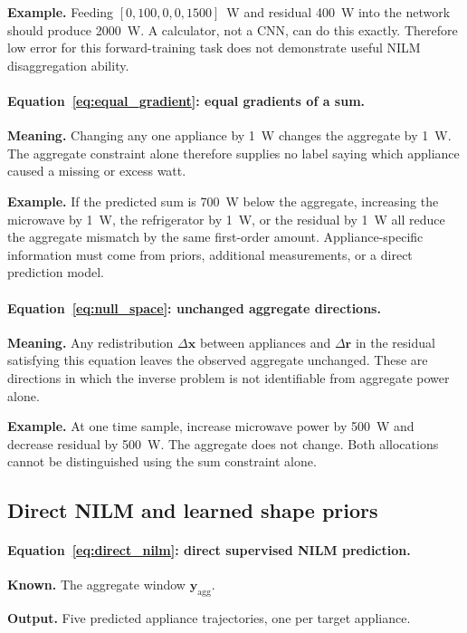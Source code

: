 \documentclass[11pt]{article}
\newcommand{\vect}[1]{\mathbf{#1}}
\begin{document}
\textbf{Example.} Feeding $[0,100,0,0,1500]$~W and residual 400~W into the network should produce 2000~W. A calculator, not a CNN, can do this exactly. Therefore low error for this forward-training task does not demonstrate useful NILM disaggregation ability.

\paragraph{Equation~\eqref{eq:equal_gradient}: equal gradients of a sum.}
\textbf{Meaning.} Changing any one appliance by 1~W changes the aggregate by 1~W. The aggregate constraint alone therefore supplies no label saying which appliance caused a missing or excess watt.

\textbf{Example.} If the predicted sum is 700~W below the aggregate, increasing the microwave by 1~W, the refrigerator by 1~W, or the residual by 1~W all reduce the aggregate mismatch by the same first-order amount. Appliance-specific information must come from priors, additional measurements, or a direct prediction model.

\paragraph{Equation~\eqref{eq:null_space}: unchanged aggregate directions.}
\textbf{Meaning.} Any redistribution $\Delta\vect{x}$ between appliances and $\Delta\vect{r}$ in the residual satisfying this equation leaves the observed aggregate unchanged. These are directions in which the inverse problem is not identifiable from aggregate power alone.

\textbf{Example.} At one time sample, increase microwave power by 500~W and decrease residual by 500~W. The aggregate does not change. Both allocations cannot be distinguished using the sum constraint alone.

\subsection{Direct NILM and learned shape priors}

\paragraph{Equation~\eqref{eq:direct_nilm}: direct supervised NILM prediction.}
\textbf{Known.} The aggregate window $\vect{y}_{\mathrm{agg}}$.

\textbf{Output.} Five predicted appliance trajectories, one per target appliance.
\end{document}
